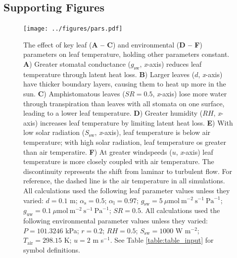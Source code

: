 \documentclass[11pt, oneside]{article}
\begin{document}
\clearpage


\subsection*{Supporting Figures}

\begin{landscape}

\begin{figure}[ht]
\centerline{\texttt{[image: ../figures/pars.pdf]}}
\end{figure}

\end{landscape}

\begin{figure}[t!]
\caption{The effect of key leaf (\textbf{A -- C}) and environmental (\textbf{D -- F}) parameters on leaf temperature, holding other parameters constant. \textbf{A}) Greater stomatal conductance ($g_\mathrm{sw}$, \textit{x}-axis) reduces leaf temperature through latent heat loss. \textbf{B}) Larger leaves ($d$, \textit{x}-axis) have thicker boundary layers, causing them to heat up more in the sun. \textbf{C}) Amphistomatous leaves ($\mathit{SR} = 0.5$, \textit{x}-axis) lose more water through transpiration than leaves with all stomata on one surface, leading to a lower leaf temperature. \textbf{D}) Greater humidity ($\mathit{RH}$, \textit{x}-axis) increases leaf temperature by limiting latent heat loss. \textbf{E}) With low solar radiation ($S_\mathrm{sw}$, \textit{x}-axis), leaf temperature is below air temperature; with high solar radiation, leaf temperature os greater than air temperatire. \textbf{F}) At greater windspeeds ($u$, \textit{x}-axis) leaf temperature is more closely coupled with air temperature. The discontinuity represents the shift from laminar to turbulent flow. For reference, the dashed line is the air temperature in all simulations. All calculations used the following leaf parameter values unless they varied: $d = 0.1$ m; $\alpha_\mathrm{s} = 0.5$; $\alpha_\mathrm{l} = 0.97$; $g_\mathrm{sw} = 5~\mu \textrm{mol}~\textrm{m} ^ {-2}~\textrm{s} ^ {-1}~\textrm{Pa} ^ {-1}$; $g_\mathrm{uw} = 0.1~\mu \textrm{mol}~\textrm{m} ^ {-2}~\textrm{s} ^ {-1}~\textrm{Pa} ^ {-1}$; $\mathit{SR} = 0.5$. All calculations used the following environmental parameter values unless they varied: $P = 101.3246$ kPa; $r = 0.2$; $\mathit{RH} = 0.5$; $S_\mathrm{sw} = 1000$ W m$^{-2}$; $T_\mathrm{air} = 298.15$ K; $u = 2$ m s$^{-1}$. See Table \ref{table:table_input} for symbol definitions.}
\label{fig:pars}
\end{figure}
\end{document}
